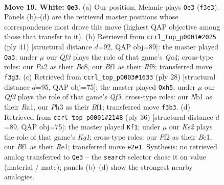 \documentclass[11pt]{article}
\begin{document}
\clearpage

\begin{figure}[p]\centering
\begin{subfigure}{0.46\textwidth}\centering
\resizebox{\linewidth}{!}{%
\newchessgame
\chessboard[
  setfen={r1b1k2r/4bp2/5n2/p2pp3/3q2pp/5Q1P/PP2KPP1/RNB2B1R w kq - 0 19},
  showmover=false,
  pgfstyle=straightmove, color=movearrow, markmove={f3-e3}
]}
\caption{}
\end{subfigure}\hfill
\begin{subfigure}{0.46\textwidth}\centering
\resizebox{\linewidth}{!}{%
\newchessgame
\chessboard[
  setfen={r1b2rk1/5pp1/p1p1p2p/q5P1/1PP4P/2bN1Q2/P4PB1/R4K1R b - - 2 21},
  showmover=false,
  pgfstyle=straightmove, color=movearrow, markmove={a5-a3}
]}
\caption{}
\end{subfigure}
\\[4pt]
\begin{subfigure}{0.46\textwidth}\centering
\resizebox{\linewidth}{!}{%
\newchessgame
\chessboard[
  setfen={r1b2rk1/pp2bpp1/2n5/q2p2Pp/3N3P/2P1BQ2/PP3P2/R3KBR1 w Q - 0 15},
  showmover=false,
  pgfstyle=straightmove, color=movearrow, markmove={f3-h5}
]}
\caption{}
\end{subfigure}\hfill
\begin{subfigure}{0.46\textwidth}\centering
\resizebox{\linewidth}{!}{%
\newchessgame
\chessboard[
  setfen={r3k2r/ppb2pp1/2pqp1n1/8/P2PQ2p/2PB3P/1P3PP1/R1B1R1K1 w kq - 1 19},
  showmover=false,
  pgfstyle=straightmove, color=movearrow, markmove={g1-f1}
]}
\caption{}
\end{subfigure}
\caption{\textbf{Move 19, White: \texttt{Qe3}.} (a) Our position; Melanie plays \texttt{Qe3} (\texttt{f3e3}). Panels (b)--(d) are the retrieved master positions whose correspondence most drove this move (highest QAP objective among those that transfer to it). (b) Retrieved from \texttt{ccrl\_top\_p0001\#2025} (ply 41) [structural distance $d$=92, QAP obj=89]: the master played \texttt{Qa3}; under $\mu$ our \emph{Qf3} plays the role of that game's \emph{Qa4}; cross-type roles: our \emph{P}a2 as their \emph{B}c8, our \emph{B}f1 as their \emph{R}f8; transferred move \texttt{f3g3}. (c) Retrieved from \texttt{ccrl\_top\_p0003\#1633} (ply 28) [structural distance $d$=95, QAP obj=75]: the master played \texttt{Qxh5}; under $\mu$ our \emph{Qf3} plays the role of that game's \emph{Qf3}; cross-type roles: our \emph{N}b1 as their \emph{R}a1, our \emph{P}h3 as their \emph{B}f1; transferred move \texttt{f3b3}. (d) Retrieved from \texttt{ccrl\_top\_p0001\#2148} (ply 36) [structural distance $d$=89, QAP obj=75]: the master played \texttt{Kf1}; under $\mu$ our \emph{Ke2} plays the role of that game's \emph{Kg1}; cross-type roles: our \emph{P}f2 as their \emph{B}c1, our \emph{B}f1 as their \emph{R}e1; transferred move \texttt{e2e1}. Synthesis: no retrieved analog transferred to \texttt{Qe3} -- the \texttt{search} selector chose it on value (material / mate); panels (b)--(d) show the strongest nearby analogies.}
\label{fig:thought-m36}
\end{figure}
\end{document}

